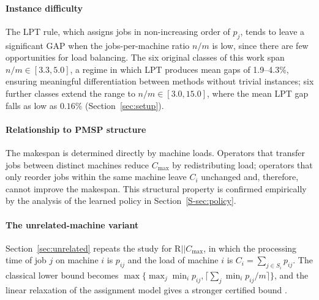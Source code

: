 \documentclass[final,3p,times,11pt,authoryear]{elsarticle}
\begin{document}
\paragraph{Instance difficulty}
The LPT rule, which assigns jobs in non-increasing order of $p_j$,
tends to leave a significant GAP when the jobs-per-machine ratio $n/m$
is low, since there are few opportunities for load balancing.
The six original classes of this work span $n/m \in [3.3, 5.0]$, a
regime in which LPT produces mean gaps of 1.9--4.3\%, ensuring
meaningful differentiation between methods without trivial instances;
six further classes extend the range to $n/m \in [3.0, 15.0]$, where
the mean LPT gap falls as low as $0.16\%$ (Section~\ref{sec:setup}).

\paragraph{Relationship to PMSP structure}
The makespan is determined directly by machine loads.
Operators that transfer jobs between distinct machines reduce
$C_{\max}$ by redistributing load; operators that only reorder jobs
within the same machine leave $C_i$ unchanged and, therefore, cannot
improve the makespan.
This structural property is confirmed empirically by the analysis of
the learned policy in Section~\ref{S-sec:policy}.

\paragraph{The unrelated-machine variant}
Section~\ref{sec:unrelated} repeats the study for $\mathrm{R}||C_{\max}$, in which
the processing time of job $j$ on machine $i$ is $p_{ij}$ and the load of machine $i$
is $C_i=\sum_{j\in S_i}p_{ij}$. The classical lower bound becomes
$\max\{\max_j\min_i p_{ij},\lceil\sum_j\min_i p_{ij}/m\rceil\}$, and the linear
relaxation of the assignment model gives a stronger certified bound
\citep{LenstraEtal1990}.


\end{document}

